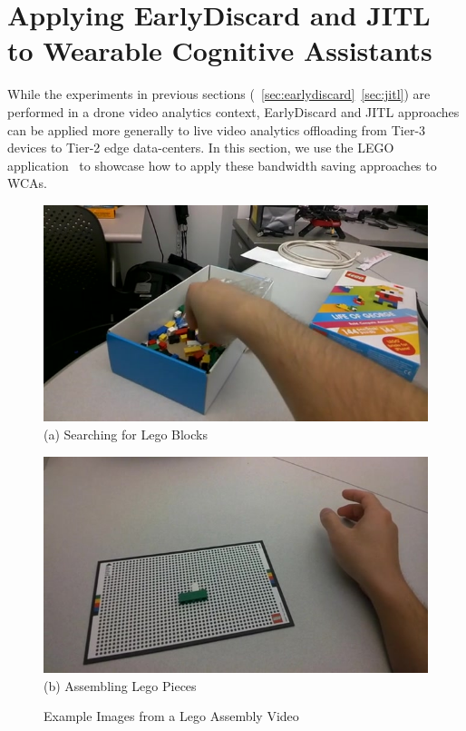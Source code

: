 \section{Applying EarlyDiscard and JITL to Wearable Cognitive Assistants}
\label{bw:wca}

While the experiments in previous sections
(~\ref{sec:earlydiscard}~\ref{sec:jitl}) are performed in a drone video
analytics context, EarlyDiscard and JITL approaches can be applied more
generally to live video analytics offloading from Tier-3 devices to Tier-2 edge
data-centers. In this section, we use the LEGO
application~\cite{chen2018application} to showcase how to apply these bandwidth
saving approaches to WCAs.

\begin{figure}
    \centering
    \begin{minipage}[]{0.45\linewidth}
        \centering
        \includegraphics[width=\linewidth]{FIGS/lego-search}\\
        {(a) Searching for Lego Blocks}
    \end{minipage}
    \begin{minipage}[]{0.45\linewidth}
        \centering
        \includegraphics[width=\linewidth]{FIGS/lego-assembled}\\
        {(b) Assembling Lego Pieces}
    \end{minipage}
    \caption{Example Images from a Lego Assembly Video}
    \label{fig:wca-lego-example-images}
\end{figure}

